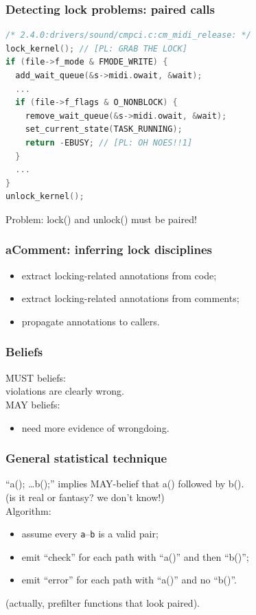 \documentclass{beamer}
\newenvironment{changemargin}[1]{%
  \begin{list}{}{%
    \setlength{\topsep}{0pt}%
    \setlength{\leftmargin}{#1}%
    \setlength{\rightmargin}{1em}
    \setlength{\listparindent}{\parindent}%
    \setlength{\itemindent}{\parindent}%
    \setlength{\parsep}{\parskip}%
  }%
  \item[]}{\end{list}}
\begin{document}
\begin{frame}[fragile]
  \frametitle{Detecting lock problems: paired calls}
    \begin{lstlisting}[language=C,commentstyle={\color{red}\bf}]
/* 2.4.0:drivers/sound/cmpci.c:cm_midi_release: */
lock_kernel(); // [PL: GRAB THE LOCK]
if (file->f_mode & FMODE_WRITE) {
  add_wait_queue(&s->midi.owait, &wait);
  ...
  if (file->f_flags & O_NONBLOCK) {
    remove_wait_queue(&s->midi.owait, &wait);
    set_current_state(TASK_RUNNING);
    return -EBUSY; // [PL: OH NOES!!1]
  }
  ...
}
unlock_kernel();
    \end{lstlisting}
    \begin{changemargin}{1cm}
      \Large
      Problem: lock() and unlock() must be paired!
  \end{changemargin}
\end{frame}

\begin{frame}[fragile]
\frametitle{aComment: inferring lock disciplines}
\begin{changemargin}{2cm}
  \begin{itemize}
  \item extract locking-related annotations from code;
  \item extract locking-related annotations from comments;
  \item propagate annotations to callers.
  \end{itemize}
\end{changemargin}
\end{frame}

\begin{frame}
\frametitle{Beliefs}
  \begin{changemargin}{2cm}
    MUST beliefs:\\
\hspace*{2em} violations are clearly wrong.\\[1em]
    MAY beliefs:\\
    \begin{itemize}
      \item need more evidence of wrongdoing.
    \end{itemize}
  \end{changemargin}
\end{frame}

\begin{frame}
\frametitle{General statistical technique}
  \begin{changemargin}{2cm}
``a(); \ldots b();'' implies MAY-belief that a() followed by b().\\
(is it real or fantasy? we don't know!)\\[2em]
Algorithm: 
\begin{itemize}
\item assume every {\tt a}--{\tt b} is a valid pair;
\item emit ``check'' for each path with ``a()'' and then ``b()'';
\item emit ``error'' for each path with ``a()'' and no ``b()''.
\end{itemize}
(actually, prefilter functions that look paired).
  \end{changemargin}
\end{frame}
\end{document}
